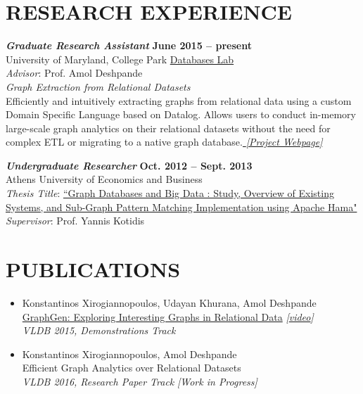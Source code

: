 \documentclass[margin, 10pt]{res} %
\begin{document}
\begin{resume}

\section{RESEARCH EXPERIENCE}

{\sl \textbf{Graduate Research Assistant}} \hfill \textbf{June 2015 -- present} \\
University of Maryland, College Park \href{http://www.cs.umd.edu/~amol/DBGroup/pubs.html}{Databases Lab}\\
\textit{Advisor}: Prof. Amol Deshpande\\
{\sl Graph Extraction from Relational Datasets}\\
  Efficiently and intuitively extracting graphs from relational data using a custom Domain Specific Language based on Datalog. Allows users to conduct in-memory large-scale graph analytics on their relational datasets without the need for complex ETL or migrating to a native graph database.\href{http://konstantinosx.github.io/graphgen-project/}{\textit{ [Project Webpage]}}

{\sl \textbf{Undergraduate Researcher}} \hfill \textbf{Oct. 2012 -- Sept. 2013}\\
Athens University of Economics and Business\\
\textit{Thesis Title}:
\href{https://drive.google.com/open?id=0B20MIwp_I7FlVFlNVWtQb3VXTmM}{``Graph Databases and Big Data : Study, Overview of Existing Systems, and Sub-Graph Pattern Matching Implementation using Apache Hama"}\\
\textit{Supervisor}: Prof. Yannis Kotidis


\section{PUBLICATIONS }

\begin{itemize}
   \item Konstantinos Xirogiannopoulos, Udayan Khurana, Amol Deshpande\\
  \href{http://www.vldb.org/pvldb/vol8/p2032-xirogiannopoulos.pdf}{GraphGen: Exploring Interesting Graphs in Relational Data} \textit{[\href{https://www.youtube.com/watch?v=GDVBLv-oedQ}{video}]}\\
  \textit{VLDB 2015, Demonstrations Track}
  \item Konstantinos Xirogiannopoulos, Amol Deshpande\\
  Efficient Graph Analytics over Relational Datasets\\
  \textit{ VLDB 2016, Research Paper Track} \textit{ [Work in Progress]}
\end{itemize}


\end{resume}
\end{document}
